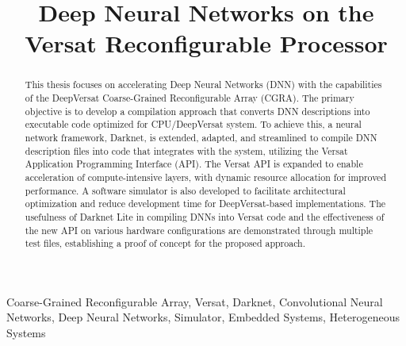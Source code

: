 \documentclass[conference]{IEEEtran}
\begin{document}
\lstset{language=C++}
\lstset{basicstyle=\scriptsize}
	


\title{Deep Neural Networks on the Versat Reconfigurable Processor\\ }

\author{
}

\maketitle

\begin{abstract}
This thesis focuses on accelerating Deep Neural Networks (DNN) with the capabilities of the DeepVersat Coarse-Grained Reconfigurable Array (CGRA). 
The primary objective is to develop a compilation approach that converts DNN descriptions into executable code optimized for CPU/DeepVersat system. 
To achieve this, a neural network framework, Darknet, is extended, adapted, and streamlined to compile DNN description files into code that integrates with the system, utilizing the Versat Application Programming Interface (API). 
The Versat API is expanded to enable acceleration of compute-intensive layers, with dynamic resource allocation for improved performance. A software simulator is also developed to facilitate architectural optimization and reduce development time for DeepVersat-based implementations. 
The usefulness of Darknet Lite in compiling DNNs into Versat code and the effectiveness of the new API on various hardware configurations are demonstrated through multiple test files, establishing a proof of concept for the proposed approach.
    
\end{abstract}

\begin{IEEEkeywords}
    Coarse-Grained Reconfigurable Array, Versat, Darknet, Convolutional Neural Networks, Deep Neural Networks, Simulator, Embedded Systems, Heterogeneous Systems
\end{IEEEkeywords}
\end{document}
